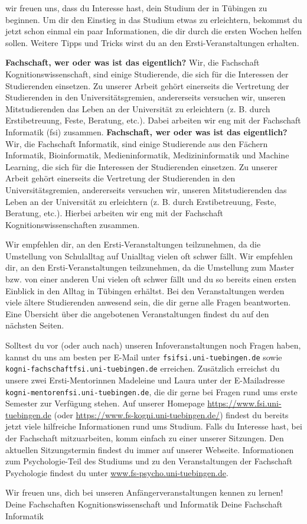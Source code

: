 wir freuen uns, dass du Interesse hast, dein Studium der \studiengang in Tübingen zu beginnen.
Um dir den Einstieg in das Studium etwas zu erleichtern, bekommst du jetzt schon einmal
ein paar Informationen, die dir durch die ersten Wochen helfen sollen.
Weitere Tipps und Tricks wirst du an den Ersti-Veranstaltungen erhalten.


\ifkogwiss
\textbf{\glqq Fachschaft\grqq, wer oder was ist das eigentlich?} Wir, die Fachschaft Kognitionswissenschaft, sind einige Studierende, die sich für die Interessen der Studierenden einsetzen. Zu unserer Arbeit
gehört einerseits die Vertretung der Studierenden in den Universitätsgremien, andererseits versuchen wir, unseren
Mitstudierenden das Leben an der Universität zu erleichtern (z. B. durch Erstibetreuung, Feste,
Beratung, etc.). Dabei arbeiten wir eng mit der Fachschaft Informatik (fsi) zusammen.
\else
\textbf{\glqq Fachschaft\grqq, wer oder was ist das eigentlich?} Wir, die Fachschaft Informatik, sind einige Studierende aus den Fächern
Informatik, Bioinformatik, Medieninformatik, Medizininformatik und Machine Learning, die sich für die Interessen der Studierenden einsetzen. Zu unserer Arbeit
gehört einerseits die Vertretung der Studierenden in den Universitätsgremien, andererseits versuchen wir, unseren
Mitstudierenden das Leben an der Universität zu erleichtern (z. B. durch Erstibetreuung, Feste, Beratung, etc.). Hierbei arbeiten wir eng mit der Fachschaft Kognitionswissenschaften zusammen.
\fi

\ifbachelor 
Wir empfehlen dir, an den Ersti-Veranstaltungen teilzunehmen, da die Umstellung von Schulalltag
auf Unialltag vielen oft schwer fällt. 
\fi
\ifmaster
Wir empfehlen dir, an den Ersti-Veranstaltungen teilzunehmen, da die Umstellung zum Master bzw. von einer anderen Uni vielen oft schwer fällt und du so bereits einen ersten Einblick in den Alltag in Tübingen erhältst.
\fi 
Bei den Veranstaltungen werden viele ältere Studierenden
anwesend sein, die dir gerne alle Fragen beantworten. Eine Übersicht über die angebotenen
Veranstaltungen findest du auf den nächsten Seiten.

Solltest du vor (oder auch nach) unseren Infoveranstaltungen noch Fragen haben, kannst du uns
am besten per E-Mail unter \texttt{fsi\At fsi.uni-tuebingen.de} 
\ifkogwiss
sowie \texttt{kogni-fachschaft\At fsi.uni-tuebingen.de}
\fi
erreichen.
\ifkogwiss
Zusätzlich erreichst du unsere zwei Ersti-Mentorinnen Madeleine und Laura unter der E-Mailadresse \texttt{kogni-mentoren\At fsi.uni-tuebingen.de}, die dir gerne bei Fragen rund ums erste Semester zur Verfügung stehen.
\fi
Auf unserer Homepage
\url{https://www.fsi.uni-tuebingen.de} (oder \url{https://www.fs-kogni.uni-tuebingen.de/}) findest du bereits jetzt viele hilfreiche Informationen rund
ums Studium. Falls du Interesse hast, bei der Fachschaft mitzuarbeiten, komm einfach zu einer unserer Sitzungen. Den aktuellen Sitzungstermin findest du immer auf unserer Webseite. 
\ifkogwiss  Informationen zum Psychologie-Teil des Studiums und zu den Veranstaltungen der
Fachschaft Psychologie findest du unter \url{www.fs-psycho.uni-tuebingen.de}.\fi

Wir freuen uns, dich bei unseren Anfängerveranstaltungen kennen zu lernen!\\
\ifkogwiss
Deine Fachschaften Kognitionswissenschaft und Informatik
\else
Deine Fachschaft Informatik
\fi
\vfill
